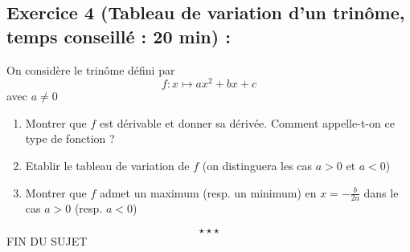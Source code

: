\subsection*{Exercice 4 (Tableau de variation d'un trinôme, temps conseillé : 20 min) : }
On considère le trinôme défini par $$f:x\mapsto ax^2+bx+c$$
avec $a\neq0$
\begin{enumerate}
\item Montrer que $f$ est dérivable et donner sa dérivée. Comment appelle-t-on ce type de fonction ?
\item Etablir le tableau de variation de $f$ (on distinguera les cas $a>0$ et $a<0$)
\item Montrer que $f$ admet un maximum (resp. un minimum) en $x=-\frac{b}{2a}$ dans le cas $a>0$ (resp. $a<0$)
\end{enumerate}
$$\star \star \star$$
\center
FIN DU SUJET
